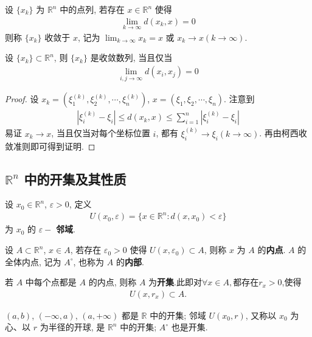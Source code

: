 \documentclass[../../main.tex]{subfiles}
\begin{document}
\begin{definition}
设 $\{x_k\}$ 为 $\mathbb{R}^n$ 中的点列, 若存在 $x \in \mathbb{R}^n$ 使得
\begin{align*}
\lim_{k \to \infty} d(x_k, x) = 0
\end{align*}
则称 $\{x_k\}$ 收敛于 $x$, 记为 $\lim_{k \to \infty} x_k = x$ 或 $x_k \to x (k \to \infty)$.
\end{definition}

\begin{proposition}
设 $\{x_k\} \subset \mathbb{R}^n$, 则 $\{x_k\}$ 是收敛数列, 当且仅当
\begin{align*}
\lim_{i, j \to \infty} d(x_i, x_j) = 0
\end{align*} 
\end{proposition}
\begin{proof}
设 $x_k = (\xi_1^{(k)}, \xi_2^{(k)}, \cdots, \xi_n^{(k)})$, $x = (\xi_1, \xi_2, \cdots, \xi_n)$. 注意到
\begin{align*}
|\xi_i^{(k)} - \xi_i| \leqslant d(x_k, x) \leqslant \sum_{i = 1}^{n}|\xi_i^{(k)} - \xi_i|
\end{align*}
易证 $x_k \to x$, 当且仅当对每个坐标位置 $i$, 都有 $\xi_i^{(k)} \to \xi_i (k \to \infty)$. 再由柯西收敛准则即可得到证明.

\end{proof}

\subsection{$\mathbb{R}^n$ 中的开集及其性质} 

\begin{definition}[邻域、内点、内部和开集]
设 $x_0 \in \mathbb{R}^n$, $\varepsilon > 0$, 定义
\begin{align*}
U(x_0, \varepsilon) = \{x \in \mathbb{R}^n : d(x, x_0) < \varepsilon\}
\end{align*}
为 $x_0$ 的 $\varepsilon -$ \textbf{邻域}.

设 $A \subset \mathbb{R}^n$, $x \in A$, 若存在 $\varepsilon_0 > 0$ 使得 $U(x, \varepsilon_0) \subset A$, 则称 $x$ 为 $A$ 的\textbf{内点}. $A$ 的全体内点, 记为 $A^\circ$, 也称为 $A$ 的\textbf{内部}.

若 $A$ 中每个点都是 $A$ 的内点, 则称 $A$ 为\textbf{开集}.此即对$\forall x\in A,$都存在$r_x>0$,使得
\begin{align*}
U(x,r_x)\subset A.
\end{align*}
\end{definition}
\begin{note}
$(a, b)$, $(-\infty, a)$, $(a, +\infty)$ 都是 $\mathbb{R}$ 中的开集; 邻域 $U(x_0, r)$, 又称以 $x_0$ 为心、以 $r$ 为半径的开球, 是 $\mathbb{R}^n$ 中的开集; $A^\circ$ 也是开集.
\end{note}
\end{document}
